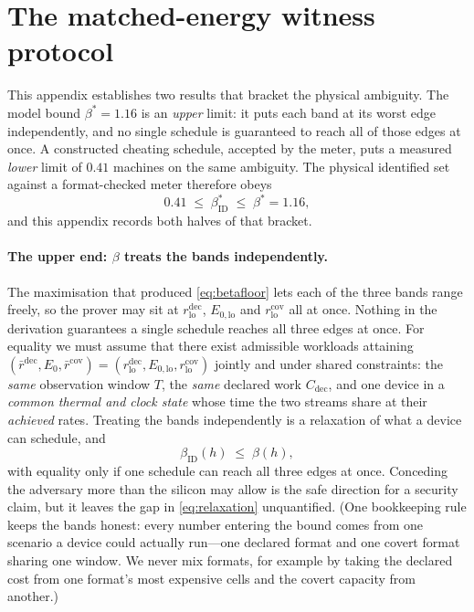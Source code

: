 \documentclass{article}
\theoremstyle{plain}
\theoremstyle{definition}
\theoremstyle{remark}
\begin{document}
\section{The matched-energy witness protocol}
\label{app:boundkind}
\label{app:witness}

This appendix establishes two results that bracket the physical ambiguity.
The model bound $\beta^{*} = 1.16$ is an \emph{upper} limit: it puts each
band at its worst edge independently, and no single schedule is guaranteed to
reach all of those edges at once. A constructed cheating schedule, accepted by the meter, puts a
measured \emph{lower} limit of $0.41$ machines on the same ambiguity. The
physical identified set against a format-checked meter therefore obeys
\begin{equation}
	0.41 \;\leq\; \beta_{\mathrm{ID}}^{*} \;\leq\; \beta^{*} = 1.16,
	\label{eq:ambiguity-bracket}
\end{equation}
and this appendix records both
halves of that bracket.

\paragraph{The upper end: $\beta$ treats the bands independently.}
The maximisation that produced \cref{eq:betafloor} lets each of the three
bands range freely, so the prover may sit at
$r_{\mathrm{lo}}^{\mathrm{dec}}$, $E_{0,\mathrm{lo}}$ and
$r_{\mathrm{lo}}^{\mathrm{cov}}$ all at once. Nothing in the derivation
guarantees a single schedule reaches all three edges at once. For equality we must
assume that there exist admissible workloads attaining
$(\bar r^{\mathrm{dec}}, E_0, \bar r^{\mathrm{cov}}) =
(r_{\mathrm{lo}}^{\mathrm{dec}}, E_{0,\mathrm{lo}}, r_{\mathrm{lo}}^{\mathrm{cov}})$
jointly and under shared constraints: the \emph{same} observation window $T$,
the \emph{same} declared work $C_{\mathrm{dec}}$, and one device in a
\emph{common thermal and clock state} whose time the two streams share
at their \emph{achieved} rates. Treating the bands
independently is a relaxation of what a device can schedule, and
\begin{equation}
	\beta_{\mathrm{ID}}(h) \;\le\; \beta(h),
	\label{eq:relaxation}
\end{equation}
with equality only if one schedule can reach all three edges at once. Conceding the adversary more
than the silicon may allow is the safe direction for a security claim,
but it leaves the gap in \cref{eq:relaxation} unquantified. (One
bookkeeping rule keeps the bands honest: every number entering the bound
comes from one scenario a device could actually run---one declared format
and one covert format sharing one window. We never mix formats, for
example by taking the declared cost from one format's most expensive
cells and the covert capacity from another.)
\end{document}
